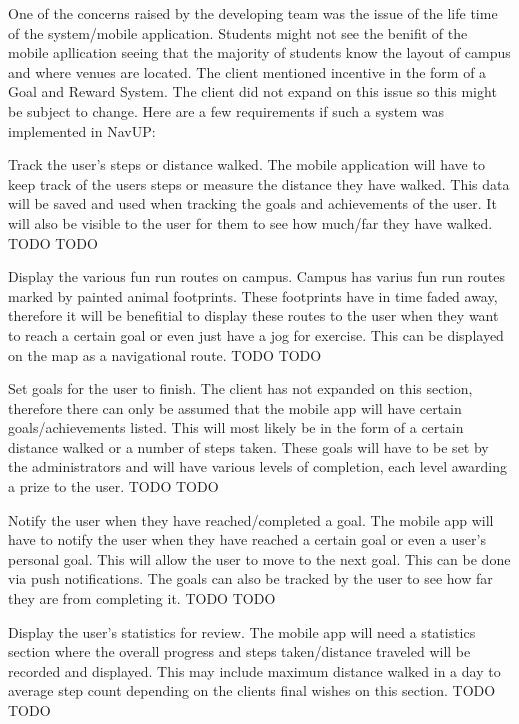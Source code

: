 One of the concerns raised by the developing team was the issue of the life time of the system/mobile application. Students might not see the benifit of the mobile apllication seeing that the majority of students know the layout of campus and where venues are located. The client mentioned incentive in the form of a Goal and Reward System. The client did not expand on this issue so this might be subject to change. Here are a few requirements if such a system was implemented in NavUP:

\FuncReq
{Track the user's steps or distance walked.}
{The mobile application will have to keep track of the users steps or measure the distance they have walked. This data will be saved and used when tracking the goals and achievements of the user. It will also be visible to the user for them to see how much/far they have walked.}
{TODO}
{TODO}

\FuncReq
{Display the various fun run routes on campus.}
{Campus has varius fun run routes marked by painted animal footprints. These footprints have in time faded away, therefore it will be benefitial to display these routes to the user when they want to reach a certain goal or even just have a jog for exercise. This can be displayed on the map as a navigational route.}
{TODO}
{TODO}

\FuncReq
{Set goals for the user to finish.}
{The client has not expanded on this section, therefore there can only be assumed that the mobile app will have certain goals/achievements listed. This will most likely be in the form of a certain distance walked or a number of steps taken. These goals will have to be set by the administrators and will have various levels of completion, each level awarding a prize to the user.}
{TODO}
{TODO}

\FuncReq
{Notify the user when they have reached/completed a goal.}
{The mobile app will have to notify the user when they have reached a certain goal or even a user's personal goal. This will allow the user to move to the next goal. This can be done via push notifications. The goals can also be tracked by the user to see how far they are from completing it.}
{TODO}
{TODO}

\FuncReq
{Display the user's statistics for review.}
{The mobile app will need a statistics section where the overall progress and steps taken/distance traveled will be recorded and displayed. This may include maximum distance walked in a day to average step count depending on the clients final wishes on this section.}
{TODO}
{TODO}

